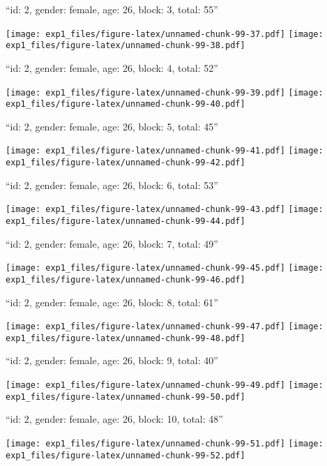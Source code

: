 \documentclass[,]{article}
\begin{document}
\newpage
[1] 

``id: 2, gender: female, age: 26, block: 3, total: 55''

\texttt{[image: exp1\_files/figure-latex/unnamed-chunk-99-37.pdf]}
\texttt{[image: exp1\_files/figure-latex/unnamed-chunk-99-38.pdf]}

\newpage
[1] 

``id: 2, gender: female, age: 26, block: 4, total: 52''

\texttt{[image: exp1\_files/figure-latex/unnamed-chunk-99-39.pdf]}
\texttt{[image: exp1\_files/figure-latex/unnamed-chunk-99-40.pdf]}

\newpage
[1] 

``id: 2, gender: female, age: 26, block: 5, total: 45''

\texttt{[image: exp1\_files/figure-latex/unnamed-chunk-99-41.pdf]}
\texttt{[image: exp1\_files/figure-latex/unnamed-chunk-99-42.pdf]}

\newpage
[1] 

``id: 2, gender: female, age: 26, block: 6, total: 53''

\texttt{[image: exp1\_files/figure-latex/unnamed-chunk-99-43.pdf]}
\texttt{[image: exp1\_files/figure-latex/unnamed-chunk-99-44.pdf]}

\newpage
[1] 

``id: 2, gender: female, age: 26, block: 7, total: 49''

\texttt{[image: exp1\_files/figure-latex/unnamed-chunk-99-45.pdf]}
\texttt{[image: exp1\_files/figure-latex/unnamed-chunk-99-46.pdf]}

\newpage
[1] 

``id: 2, gender: female, age: 26, block: 8, total: 61''

\texttt{[image: exp1\_files/figure-latex/unnamed-chunk-99-47.pdf]}
\texttt{[image: exp1\_files/figure-latex/unnamed-chunk-99-48.pdf]}

\newpage
[1] 

``id: 2, gender: female, age: 26, block: 9, total: 40''

\texttt{[image: exp1\_files/figure-latex/unnamed-chunk-99-49.pdf]}
\texttt{[image: exp1\_files/figure-latex/unnamed-chunk-99-50.pdf]}

\newpage
[1] 

``id: 2, gender: female, age: 26, block: 10, total: 48''

\texttt{[image: exp1\_files/figure-latex/unnamed-chunk-99-51.pdf]}
\texttt{[image: exp1\_files/figure-latex/unnamed-chunk-99-52.pdf]}
\end{document}
